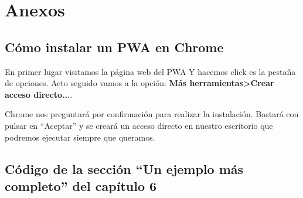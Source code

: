 \chapter{Anexos}\label{anexos}

\section{Cómo instalar un PWA en Chrome}

En primer lugar visitamos la página web del PWA Y hacemos click es la pestaña de opciones. Acto seguido vamos a la opción: \textbf{Más herramientas\textgreater Crear acceso directo...}.


Chrome nos preguntará por confirmación para realizar la instalación. Bastará con pulsar en ``Aceptar'' y se creará un acceso directo en nuestro escritorio que podremos ejecutar siempre que queramos.
\pagebreak
\section{Código de la sección ``Un ejemplo más completo'' del capítulo 6}


